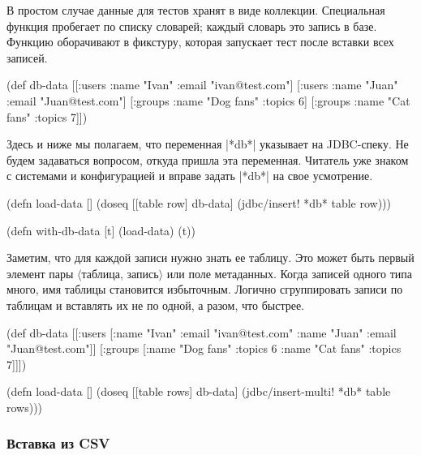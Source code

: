 В простом случае данные для тестов хранят в виде коллекции. Специальная функция
пробегает по списку словарей; каждый словарь это запись в базе. Функцию
оборачивают в фикстуру, которая запускает тест после вставки всех записей.

\begin{english}
  \begin{clojure}
(def db-data
  [[:users {:name "Ivan" :email "ivan@test.com"}]
   [:users {:name "Juan" :email "Juan@test.com"}]
   [:groups {:name "Dog fans" :topics 6}]
   [:groups {:name "Cat fans" :topics 7}]])
  \end{clojure}
\end{english}

Здесь и ниже мы полагаем, что переменная \spverb|*db*| указывает на
JDBC-спеку. Не будем задаваться вопросом, откуда пришла эта переменная. Читатель
уже знаком с системами и конфигурацией и вправе задать \spverb|*db*| на свое
усмотрение.

\begin{english}
  \begin{clojure}
(defn load-data []
  (doseq [[table row] db-data]
    (jdbc/insert! *db* table row)))

(defn with-db-data [t]
  (load-data) (t))
  \end{clojure}
\end{english}

Заметим, что для каждой записи нужно знать ее таблицу. Это может быть первый
элемент пары $\langle$таблица, запись$\rangle$ или поле метаданных. Когда
записей одного типа много, имя таблицы становится избыточным. Логично
сгруппировать записи по таблицам и вставлять их не по одной, а разом, что
быстрее.

\begin{english}
  \begin{clojure}
(def db-data
  [[:users [{:name "Ivan" :email "ivan@test.com"}
            {:name "Juan" :email "Juan@test.com"}]]
   [:groups [{:name "Dog fans" :topics 6}
             {:name "Cat fans" :topics 7}]]])

(defn load-data []
  (doseq [[table rows] db-data]
    (jdbc/insert-multi! *db* table rows)))
  \end{clojure}
\end{english}

\subsubsection*{Вставка из CSV}

